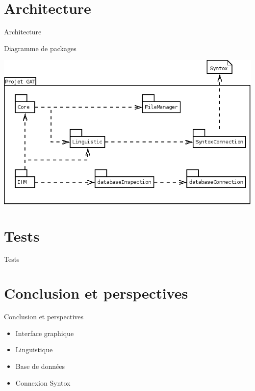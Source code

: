 \documentclass[11pt]{beamer}
\begin{document}
\section{Architecture}
\begin{frame}{Architecture}
\begin{block}{Diagramme de packages}
\begin{center}
\includegraphics[scale=0.4]{DiagPackages.png}
\end{center}
\end{block}
\end{frame}

\section{Tests}
\begin{frame}{Tests}



\begin{itemize}
\end{itemize}

\begin{itemize}
\end{itemize}
\end{frame}


\section{Conclusion et perspectives}
\begin{frame}{Conclusion et perspectives}
\begin{itemize}[<+->]
\item Interface graphique
\item Linguistique
\item Base de données
\item Connexion Syntox
\end{itemize}
\end{frame}
\end{document}
